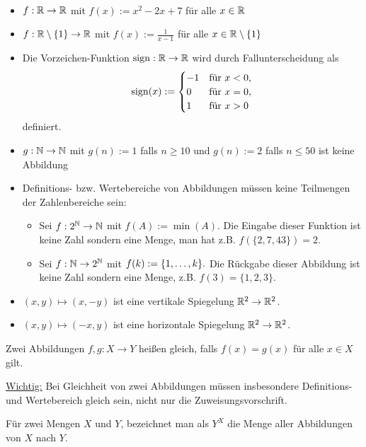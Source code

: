 \begin{bsp}\ 
\begin{itemize}
	\item $ f : \mathbb{R} \to \mathbb{R}$ mit $ f(x) := x^2 -2x + 7 $ für alle $x \in \mathbb{R}$
	\item $ f : \mathbb{R} \setminus \{ 1 \} \to \mathbb{R}$ mit $ f(x) := \frac{1}{x-1}$ für alle $x \in \mathbb{R} \setminus \{ 1 \}$
	\item Die Vorzeichen-Funktion $ \operatorname{sign}: \mathbb{R} \to \mathbb{R} $ wird durch Fallunterscheidung als 
	\[
		\operatorname{sign}(x) := \begin{cases} 
				-1 &  \text{für} \ x < 0,
				\\ 0 & \text{für} \ x =0,
				\\ 1 & \text{für}  \ x > 0
			\end{cases} 
	\]
	definiert. 
	\item $g : \mathbb{N} \to \mathbb{N}$ mit $g(n) := 1$ falls $n \geq 10$ und $g(n) := 2$ falls $n \leq 50$ ist keine Abbildung
	\item Definitions- bzw. Wertebereiche von Abbildungen müssen keine Teilmengen der Zahlenbereiche sein:
	\begin{itemize}
	 \item Sei $ f : 2^{\mathbb{N}} \to \mathbb{N}$ mit $ f(A) := \min(A) $. Die Eingabe dieser Funktion ist keine Zahl sondern eine Menge, man hat z.B. $ f( \{ 2,7,43 \} ) = 2 $.
	\item Sei $ f : \mathbb{N} \to 2^{\mathbb{N}}$ mit $ f(k) := \{ 1,\ldots,k \}.$ Die Rückgabe dieser Abbildung ist keine Zahl sondern eine Menge, z.B. $f(3) = \{1,2,3\}$. 
	\end{itemize}
	\item $(x,y) \mapsto (x,-y)$ ist eine vertikale Spiegelung $\mathbb{R}^2 \to \mathbb{R}^2$. 
	\item $(x,y) \mapsto (-x,y)$ ist eine horizontale Spiegelung $\mathbb{R}^2 \to \mathbb{R}^2$. 
\end{itemize}
\end{bsp} 

\begin{bem}
Zwei Abbildungen $ f,g : X \to Y $ heißen gleich, falls $ f(x) = g(x) $ für alle $ x \in X $ gilt.

\underline{Wichtig:} Bei Gleichheit von zwei Abbildungen müssen insbesondere Definitions- und Wertebereich gleich sein, nicht nur die Zuweisungsvorschrift.
\end{bem} 

\begin{bem} 
	Für zwei Mengen $X$ und $Y$, 
	bezeichnet man als $ Y^X $  die Menge aller Abbildungen von $ X $ nach $ Y $.
\end{bem} 

